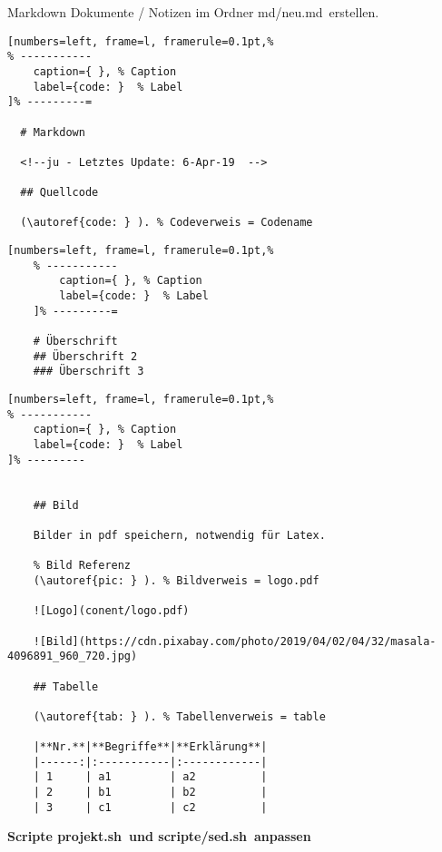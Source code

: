 Markdown Dokumente / Notizen im Ordner \frqq md/neu.md\flqq\ erstellen.

\lstset{language=Bash} %
\begin{lstlisting}[numbers=left, frame=l, framerule=0.1pt,%
% -----------
	caption={ }, % Caption
	label={code: }  % Label
]% ---------=

  # Markdown

  <!--ju - Letztes Update: 6-Apr-19  -->

  ## Quellcode

  (\autoref{code: } ). % Codeverweis = Codename
\end{lstlisting}

\lstset{language=Bash} %
\begin{lstlisting}[numbers=left, frame=l, framerule=0.1pt,%
	% -----------
		caption={ }, % Caption
		label={code: }  % Label
	]% ---------=

	# Überschrift
	## Überschrift 2
	### Überschrift 3
\end{lstlisting}

\lstset{language=Bash} %
\begin{lstlisting}[numbers=left, frame=l, framerule=0.1pt,%
% -----------
	caption={ }, % Caption
	label={code: }  % Label
]% ---------


	## Bild

	Bilder in pdf speichern, notwendig für Latex.

	% Bild Referenz
	(\autoref{pic: } ). % Bildverweis = logo.pdf

	![Logo](conent/logo.pdf)

	![Bild](https://cdn.pixabay.com/photo/2019/04/02/04/32/masala-4096891_960_720.jpg)

	## Tabelle

	(\autoref{tab: } ). % Tabellenverweis = table

	|**Nr.**|**Begriffe**|**Erklärung**|
	|------:|:-----------|:------------|
	| 1     | a1         | a2          |
	| 2     | b1         | b2          |
	| 3     | c1         | c2          |
\end{lstlisting}

\textbf{Scripte \frqq projekt.sh\flqq\ und \frqq scripte/sed.sh\flqq\ anpassen}

